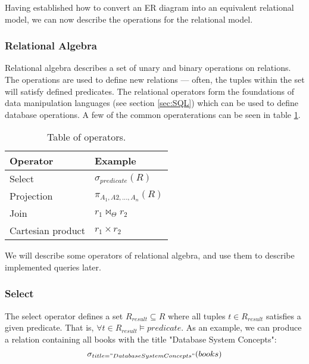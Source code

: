 
Having established how to convert an ER diagram into an equivalent relational model, we can now describe the operations for the relational model.

\subsubsection{Relational Algebra}\label{sec:relationalAlgebra}
Relational algebra describes a set of unary and binary operations on relations\cite{DBSBook}.
The operations are used to define new relations --- often, the tuples within the set will satisfy defined predicates.
The relational operators form the foundations of data manipulation languages (see section \ref{sec:SQL}) which can be used to define database operations\cite{DBSBook}.
A few of the common operaterations can be seen in table \ref{Relational algebra operators}.


\begin{table}[h]
    \centering
    \begin{tabular}{|ll|}
    \hline 
    \multicolumn{1}{|l|}{\textbf{Operator}}          & \multicolumn{1}{l|}{\textbf{Example}}   \\ \hline
    \multicolumn{1}{|l|}{Select}                     & \multicolumn{1}{l|}{$\sigma_{predicate}(R)$}            \\ \hline
    \multicolumn{1}{|l|}{Projection}                 & \multicolumn{1}{l|}{$\pi_{A_1, A2,...,A_n}(R)$}           \\ \hline
    \multicolumn{1}{|l|}{Join}                 & \multicolumn{1}{l|}{$r_1 \Join_\Theta r_2$}             \\ \hline
    \multicolumn{1}{|l|}{Cartesian product}          & \multicolumn{1}{l|}{$r_1\times r_2$}              \\ \hline
    \end{tabular}
    \caption{Table of operators.}
    \label{Relational algebra operators}
\end{table}

We will describe some operators of relational algebra, and use them to describe implemented queries later.
\subsubsection*{Select}
The select operator defines a set $R_{result}\subseteq R$ where all tuples $t \in R_{result}$ satisfies a given predicate\cite{DBSBook}.
That is, $\forall t \in R_{result} \vDash predicate$.
As an example, we can produce a relation containing all books with the title "Database System Concepts":
$$\sigma_{title = "Database System Concepts"}(books)$$

